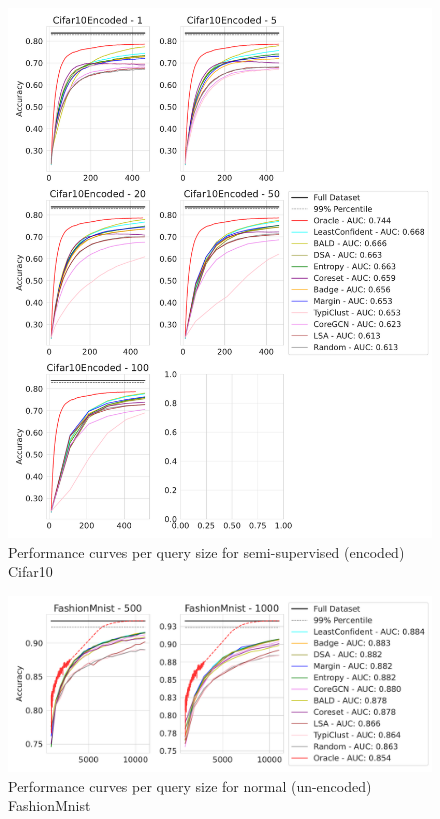 \documentclass[]{article}
\begin{document}
\begin{figure}[H]
	\centering
	\caption{Performance curves per query size for semi-supervised (encoded) Cifar10}
	\includegraphics[width=\linewidth]{img/eval_cifar10_enc}
\end{figure}
\begin{figure}[H]
	\centering
	\caption{Performance curves per query size for normal (un-encoded) FashionMnist}
	\includegraphics[width=\linewidth]{img/eval_fmnist}
\end{figure}
\end{document}
